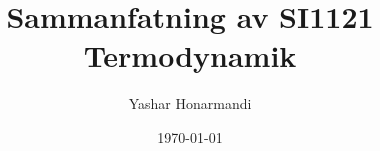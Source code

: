 \documentclass[a4paper, 11pt]{article}
\title{Sammanfatning av SI1121 Termodynamik}
\author{Yashar Honarmandi}
\date{\today}
\begin{document}
\sloppy

\maketitle

\begin{abstract}
	
\end{abstract}

\thispagestyle{empty}

\newpage

\tableofcontents

\newpage


\twocolumn


\end{document}
